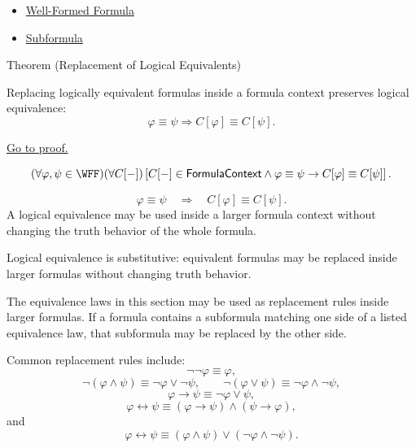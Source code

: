 \begin{dependencies}
\begin{itemize}
  \item \hyperref[def:well-formed-formula]{Well-Formed Formula}
  \item \hyperref[def:subformula-propositional-logic]{Subformula}
\end{itemize}
\end{dependencies}
\begin{theorembox}{Theorem (Replacement of Logical Equivalents)}
\begin{theorem}
\label{thm:replacement-of-logical-equivalents-propositional-logic}
Replacing logically equivalent formulas inside a formula context preserves logical equivalence:
\[
\varphi\equiv\psi
\Longrightarrow
C[\varphi]\equiv C[\psi].
\]

\noindent\hyperref[prf:replacement-of-logical-equivalents-propositional-logic]{Go to proof.}
\end{theorem}
\end{theorembox}

\begin{remark*}
\[
(\forall\varphi,\psi\in\WFF)
(\forall C[-])
\left[
C[-]\in\mathsf{FormulaContext}
\land
\varphi\equiv\psi
\to
C[\varphi]\equiv C[\psi]
\right].
\]
\end{remark*}

\begin{remark*}
\[
\varphi\equiv\psi
\quad\Longrightarrow\quad
C[\varphi]\equiv C[\psi].
\]
A logical equivalence may be used inside a larger formula context without changing
the truth behavior of the whole formula.
\end{remark*}

\begin{remark*}[Interpretation]
Logical equivalence is substitutive: equivalent formulas may be replaced inside larger formulas without changing truth behavior.
\end{remark*}

\begin{remark*}[Exposition]
The equivalence laws in this section may be used as replacement rules inside
larger formulas. If a formula contains a subformula matching one side of a listed
equivalence law, that subformula may be replaced by the other side.

Common replacement rules include:
\[
\neg\neg\varphi \equiv \varphi,
\]
\[
\neg(\varphi\land\psi)\equiv \neg\varphi\lor\neg\psi,
\qquad
\neg(\varphi\lor\psi)\equiv \neg\varphi\land\neg\psi,
\]
\[
\varphi\to\psi\equiv \neg\varphi\lor\psi,
\]
\[
\varphi\leftrightarrow\psi
\equiv
(\varphi\to\psi)\land(\psi\to\varphi),
\]
and
\[
\varphi\leftrightarrow\psi
\equiv
(\varphi\land\psi)\lor(\neg\varphi\land\neg\psi).
\]
\end{remark*}

